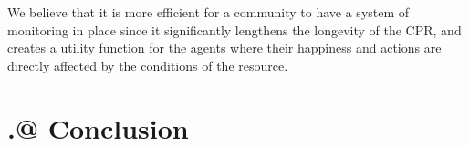 \documentclass[12pt]{article}
\makeatletter
\newcommand{\Rmnum}[1]{\expandafter\@slowromancap\romannumeral #1@}
\makeatother
\begin{document}
We believe that it is more efficient for a community to have a system of monitoring in place since it significantly lengthens the longevity of the CPR, and creates a utility function for the agents where their happiness and actions are directly affected by the conditions of the resource. 

\section{\Rmnum{4.} Conclusion}





% 
%
\end{document}
